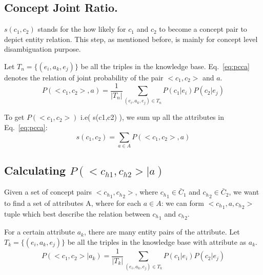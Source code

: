 \subsection{ Concept Joint Ratio.}

$s(c_1,c_2)$ stands for the how likely for $c_1$ and $c_2$ to become a concept pair to depict entity relation.
This step, as mentioned before, is mainly for concept level disambiguation purpose.

Let $T_n=\{(e_i, a_k, e_j)\}$ be all the triples in the knowledge base.
Eq.~\ref{eq:pcca} denotes the relation of joint probability of the pair $<c_1,c_2>$ and $a$.
\begin{equation}
P(<c_1, c_2>,a) = \frac{1}{|T_n|}\sum_{  (e_{i},a_k,e_{j})\in T_n } P(c_1|e_{i})P(c_2|e_{j})
\label{eq:pcca}
\end{equation}

To get $P(<c_1,c_2>)$ i.e( s(c1,c2) ), we sum up all the attributes in Eq.~\ref{eq:pcca}:
$$ s(c_1,c_2) = \sum_{a\in A} P(<c_1,c_2>,a)  $$



%

\subsection{Calculating $P(<c_{h1},c_{h2}>|a)$ }


Given a set of concept pairs $ < {c_h}_1 , {c_h}_2 > $, where ${c_h}_1\in \bar{C}_1$ and ${c_h}_2\in \bar{C}_2$, we want to find a set of attributes A, where for each $a \in A$:
we can form $ <{c_h}_1,a,{c_h}_2 >$ tuple which best describe the relation between ${c_h}_1$ and ${c_h}_2$.

For a certain attribute $a_k$, there are many entity pairs of the attribute.
Let $T_k=\{(e_i, a_k, e_j)\}$ be all the triples in the knowledge base with attribute as $a_k$.
\begin{equation}
P(<c_1, c_2>|a_k) = \frac{1}{|T_k|}\sum_{  (e_{i},a_k,e_{j})\in T_k } P(c_1|e_{i})P(c_2|e_{j})
\label{eq:pccga}
\end{equation}

